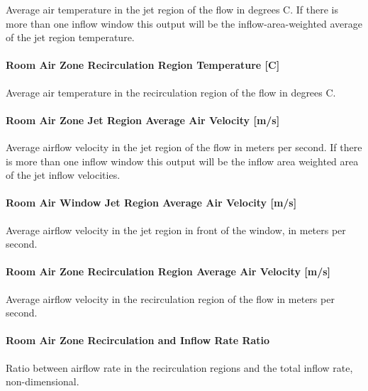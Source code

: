 Average air temperature in the jet region of the flow in degrees C. If there is more than one inflow window this output will be the inflow-area-weighted average of the jet region temperature.

\paragraph{Room Air Zone Recirculation Region Temperature {[}C{]}}\label{room-air-zone-recirculation-region-temperature-c}

Average air temperature in the recirculation region of the flow in degrees C.

\paragraph{Room Air Zone Jet Region Average Air Velocity {[}m/s{]}}\label{room-air-zone-jet-region-average-air-velocity-ms}

Average airflow velocity in the jet region of the flow in meters per second. If there is more than one inflow window this output will be the inflow area weighted area of the jet inflow velocities.

\paragraph{Room Air Window Jet Region Average Air Velocity {[}m/s{]}}\label{room-air-window-jet-region-average-air-velocity-ms}

Average airflow velocity in the jet region in front of the window, in meters per second.

\paragraph{Room Air Zone Recirculation Region Average Air Velocity {[}m/s{]}}\label{room-air-zone-recirculation-region-average-air-velocity-ms}

Average airflow velocity in the recirculation region of the flow in meters per second.

\paragraph{\texorpdfstring{Room Air Zone Recirculation and Inflow Rate Ratio \protect\hyperlink{section-1}{}}{Room Air Zone Recirculation and Inflow Rate Ratio }}\label{room-air-zone-recirculation-and-inflow-rate-ratio}

Ratio between airflow rate in the recirculation regions and the total inflow rate, non-dimensional.

